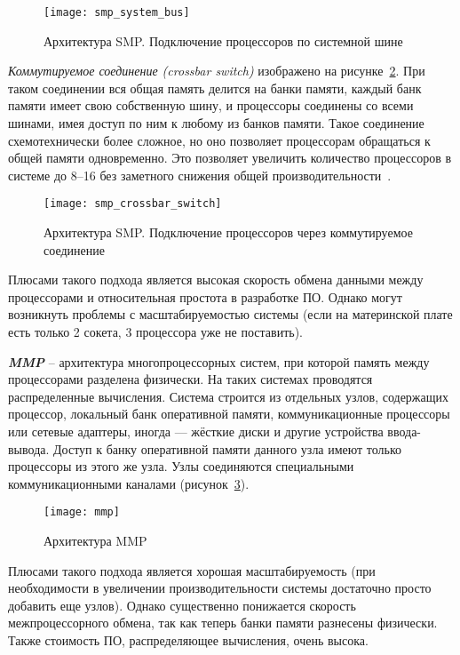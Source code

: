 \begin{figure}[H]
    \texttt{[image: smp\_system\_bus]}
    \caption{Архитектура SMP. Подключение процессоров по системной шине}
    \label{SMPSystemBus:image}
\end{figure}

\textit{Коммутируемое соединение (crossbar switch)} изображено на рисунке~\ref{SMPCrossbarSwitch:image}. При таком соединении вся общая память делится на банки памяти, каждый банк памяти имеет свою собственную шину, и процессоры соединены со всеми шинами, имея доступ по ним к любому из банков памяти. Такое соединение схемотехнически более сложное, но оно позволяет процессорам обращаться к общей памяти одновременно. Это позволяет увеличить количество процессоров в системе до 8--16 без заметного снижения общей производительности~\cite{Ryazanova2018}.

\begin{figure}[H]
    \texttt{[image: smp\_crossbar\_switch]}
    \caption{Архитектура SMP. Подключение процессоров через коммутируемое соединение}
    \label{SMPCrossbarSwitch:image}
\end{figure}

Плюсами такого подхода является высокая скорость обмена данными между процессорами и относительная простота в разработке ПО. Однако могут возникнуть проблемы с масштабируемостью системы (если на материнской плате есть только 2 сокета, 3 процессора уже не поставить).

\textbf{\textit{MMP}} -- архитектура многопроцессорных систем, при которой память между процессорами разделена физически. На таких системах проводятся распределенные вычисления. Система строится из отдельных узлов, содержащих процессор, локальный банк оперативной памяти, коммуникационные процессоры или сетевые адаптеры, иногда — жёсткие диски и другие устройства ввода-вывода. Доступ к банку оперативной памяти данного узла имеют только процессоры из этого же узла. Узлы соединяются специальными коммуникационными каналами (рисунок~\ref{MMP:image}).

\begin{figure}[H]
    \texttt{[image: mmp]}
    \caption{Архитектура MMP}
    \label{MMP:image}
\end{figure}

Плюсами такого подхода является хорошая масштабируемость (при необходимости в увеличении производительности системы достаточно просто добавить еще узлов). Однако существенно понижается скорость межпроцессорного обмена, так как теперь банки памяти разнесены физически. Также стоимость ПО, распределяющее вычисления, очень высока.
